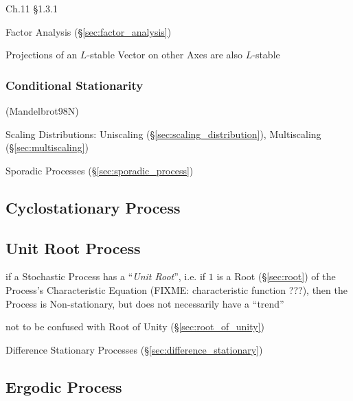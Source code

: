 Ch.11 \S 1.3.1

Factor Analysis (\S\ref{sec:factor_analysis})

Projections of an $L$-stable Vector on other Axes are also $L$-stable



\subsubsection{Conditional Stationarity}\label{sec:conditional_stationarity}

(Mandelbrot98N)

\fist Scaling Distributions: Uniscaling
(\S\ref{sec:scaling_distribution}), Multiscaling (\S\ref{sec:multiscaling})

\fist Sporadic Processes (\S\ref{sec:sporadic_process})



\subsection{Cyclostationary Process}\label{sec:cyclostationary_process}

\subsection{Unit Root Process}\label{sec:unit_root}

if a Stochastic Process has a ``\emph{Unit Root}'', i.e. if $1$ is a Root
(\S\ref{sec:root}) of the Process's Characteristic Equation (FIXME:
characteristic function ???), then the Process is Non-stationary, but does not
necessarily have a ``trend''

\fist not to be confused with Root of Unity (\S\ref{sec:root_of_unity})

Difference Stationary Processes (\S\ref{sec:difference_stationary})



\subsection{Ergodic Process}\label{sec:ergodic_process}

